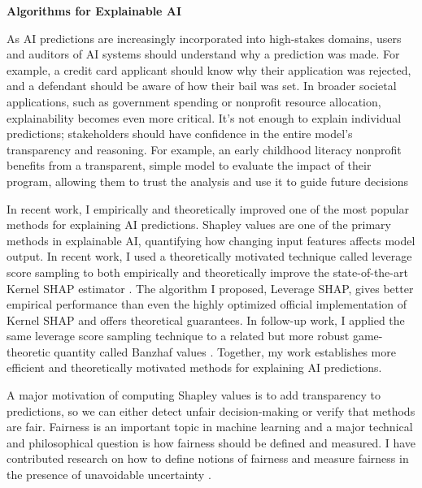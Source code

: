 \documentclass[11pt]{article}
\begin{document}
{\begin{center}
{\large \textbf{Algorithms for Explainable AI}}
\end{center}

As AI predictions are increasingly incorporated into high-stakes domains, users and auditors of AI systems should understand why a prediction was made. For example, a credit card applicant should know why their application was rejected, and a defendant should be aware of how their bail was set. In broader societal applications, such as government spending or nonprofit resource allocation, explainability becomes even more critical. It’s not enough to explain individual predictions; stakeholders should have confidence in the entire model’s transparency and reasoning. For example, an early childhood literacy nonprofit benefits from a transparent, simple model to evaluate the impact of their program, allowing them to trust the analysis and use it to guide future decisions

In recent work, I empirically and theoretically improved one of the most popular methods for explaining AI predictions. Shapley values are one of the primary methods in explainable AI, quantifying how changing input features affects model output.
In recent work, I used a theoretically motivated technique called leverage score sampling to both empirically and theoretically improve the state-of-the-art Kernel SHAP estimator \cite{musco2024leverage}. The algorithm I proposed, Leverage SHAP, gives better empirical performance than even the highly optimized official implementation of Kernel SHAP and offers theoretical guarantees. In follow-up work, I applied the same leverage score sampling technique to a related but more robust game-theoretic quantity called Banzhaf values \cite{liu2024kernel}. Together, my work establishes more efficient and theoretically motivated methods for explaining AI predictions.

A major motivation of computing Shapley values is to add transparency to predictions, so we can either detect unfair decision-making or verify that methods are fair. Fairness is an important topic in machine learning and a major technical and philosophical question is how fairness should be defined and measured. I have contributed research on how to define notions of fairness \cite{rosenblatt2023counterfactual} and measure fairness in the presence of unavoidable uncertainty \cite{witter2024fairlyuncertain}.

}
\end{document}
